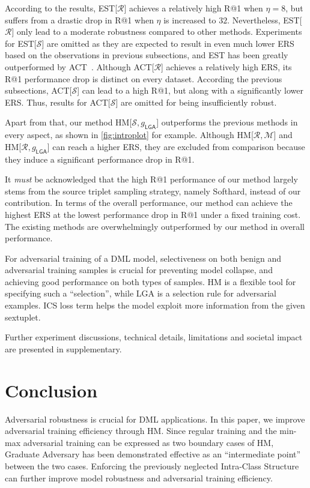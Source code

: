 \documentclass[10pt,twocolumn,letterpaper]{article}
\begin{document}
According to the results, EST[$\mathcal{R}$] achieves a relatively high R@1
when $\eta{=}8$, but suffers from a drastic drop in R@1 when $\eta$ is
increased to $32$.
%
Nevertheless, EST[$\mathcal{R}$] only lead to a moderate robustness
compared to other methods.
%
Experiments for EST[$\mathcal{S}$] are omitted as they are expected to result in
even much lower ERS based on the observations in previous subsections, and EST
has been greatly outperformed by ACT~\cite{robrank}.
%
Although ACT[$\mathcal{R}$] achieves a relatively high ERS, its R@1 performance
drop is distinct on every dataset.
%
According the previous subsections, ACT[$\mathcal{S}$] can lead to a high R@1,
but along with a significantly lower ERS.
%
Thus, results for ACT[$\mathcal{S}$] are omitted for being insufficiently robust.

Apart from that, our method HM[$\mathcal{S},g_\mathsf{LGA}$] outperforms the
previous methods in every aspect, as shown in \cref{fig:introplot} for 
example.
%
Although HM[$\mathcal{R},\mathcal{M}$] and HM[$\mathcal{R},g_\mathsf{LGA}$] can reach
a higher ERS, they are excluded from comparison because they induce a
significant performance drop in R@1.

It \emph{must} be acknowledged that the high R@1 performance of our method
largely stems from the source triplet sampling strategy, namely Softhard,
instead of our contribution.
%
In terms of the overall performance, our method can achieve the highest ERS at
the lowest performance drop in R@1 under a fixed training cost.
%
The existing methods are overwhelmingly outperformed by our method in overall
performance.

For adversarial training of a DML model, selectiveness on both benign and
adversarial training samples is crucial for preventing model collapse, and
achieving good performance on both types of samples.
%
HM is a flexible tool for specifying such a ``selection'',
while LGA is a selection rule for adversarial examples.
%
ICS loss term helps the model exploit more information from the
given sextuplet.

Further experiment discussions, technical details, limitations and societal
impact are presented in supplementary.


\section{Conclusion}
\label{sec:5}

Adversarial robustness is crucial for DML applications.
%
In this paper, we improve adversarial training efficiency through HM.
%
Since regular training and the min-max adversarial training can be expressed as
two boundary cases of HM, Graduate Adversary has been demonstrated effective as
an ``intermediate point'' between the two cases.
%
Enforcing the previously neglected Intra-Class Structure can further improve
model robustness and adversarial training efficiency.
%

{\small


}


\end{document}
